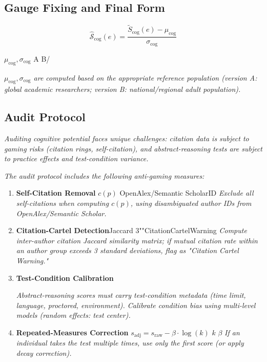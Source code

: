 \documentclass[11pt,a4paper]{article}
\theoremstyle{definition}
\newcommand{\Sopcog}{\hat{\mathcal{S}}_{\text{cog}}}
\begin{document}
\subsection{ Gauge Fixing and Final Form}

\begin{equation}
    \boxed{\Sopcog(e) = \frac{\tilde{S}_{\text{cog}}(e) - \mu_{\text{cog}}}{\sigma_{\text{cog}}}}
    \label{eq:cog-final}
\end{equation}

$\mu_{\text{cog}}, \sigma_{\text{cog}}$ A
B/

\medskip
\noindent\textit{$\mu_{\text{cog}}, \sigma_{\text{cog}}$ are computed based on the appropriate reference population (version A: global academic researchers; version B: national/regional adult population).}

\subsection{ Audit Protocol}




\medskip
\noindent\textit{Auditing cognitive potential faces unique challenges: citation data is subject to gaming risks (citation rings, self-citation), and abstract-reasoning tests are subject to practice effects and test-condition variance.}

\bigskip


\medskip
\noindent\textit{The audit protocol includes the following anti-gaming measures:}

\begin{enumerate}[leftmargin=*]
    \item \textbf{ Self-Citation Removal} $c(p)$ 
    OpenAlex/Semantic ScholarID
    \textit{Exclude all self-citations when computing $c(p)$, using disambiguated author IDs from OpenAlex/Semantic Scholar.}
    
    \item \textbf{ Citation-Cartel Detection}Jaccard
    3"\textbf{}"CitationCartelWarning
    \textit{Compute inter-author citation Jaccard similarity matrix; if mutual citation rate within an author group exceeds 3 standard deviations, flag as "Citation Cartel Warning."}
    
    \item \textbf{ Test-Condition Calibration}
    
    \textit{Abstract-reasoning scores must carry test-condition metadata (time limit, language, proctored, environment). Calibrate condition bias using multi-level models (random effects: test center).}
    
    \item \textbf{ Repeated-Measures Correction}
    $s_{\text{adj}} = s_{\text{raw}} - \beta \cdot \log(k)$
     $k$ $\beta$ 
    \textit{If an individual takes the test multiple times, use only the first score (or apply decay correction).}
\end{enumerate}
\end{document}
